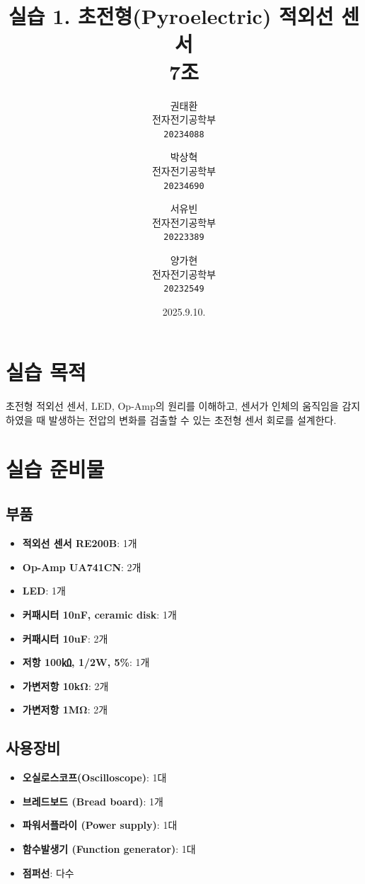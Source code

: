 \documentclass{article}
\begin{document}
\title{\textbf{실습 1. 초전형(Pyroelectric) 적외선 센서}\\
    \textbf{7조}
}
\author{
    권태환\\
    전자전기공학부\\
    \texttt{20234088}
    \and
    박상혁\\
    전자전기공학부\\
    \texttt{20234690}
    \and
    서유빈\\
    전자전기공학부\\
    \texttt{20223389}
    \and
    양가현\\
    전자전기공학부\\
    \texttt{20232549}
}
\date{2025.9.10.}
\maketitle

\section{실습 목적}
초전형 적외선 센서, LED, Op-Amp의 원리를 이해하고, 센서가 인체의 움직임을 감지하였을 때 발생하는 전압의 변화를 검출할 수 있는 초전형 센서 회로를 설계한다.

\section{실습 준비물}
\subsection{부품}
\begin{itemize}
    \item \textbf{적외선 센서 RE200B}: 1개
    \item \textbf{Op-Amp UA741CN}: 2개
    \item \textbf{LED}: 1개
    \item \textbf{커패시터 10nF, ceramic disk}: 1개
    \item \textbf{커패시터 10uF}: 2개
    \item \textbf{저항 100㏀, 1/2W, 5\%}: 1개
    \item \textbf{가변저항 10kΩ}: 2개
    \item \textbf{가변저항 1MΩ}: 2개
\end{itemize}

\subsection{사용장비}
\begin{itemize}
    \item \textbf{오실로스코프(Oscilloscope)}: 1대
    \item \textbf{브레드보드 (Bread board)}: 1개
    \item \textbf{파워서플라이 (Power supply)}: 1대
    \item \textbf{함수발생기 (Function generator)}: 1대
    \item \textbf{점퍼선}: 다수
\end{itemize}
\end{document}
